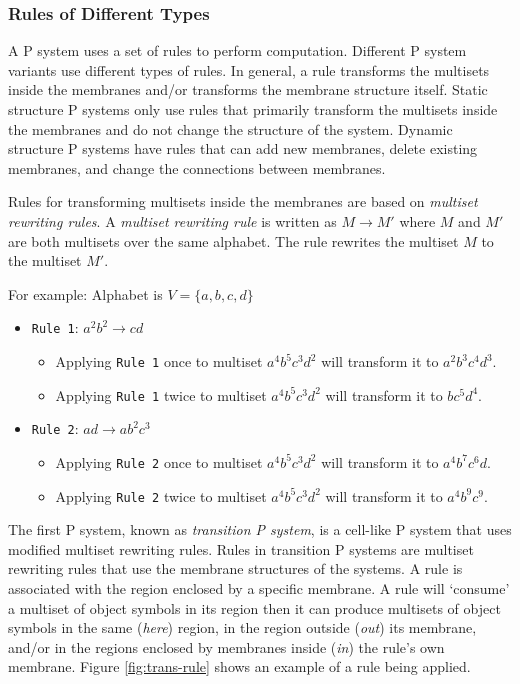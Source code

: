 \documentclass{article}
\begin{document}
\subsubsection{Rules of Different Types}\label{s-rule}

A P system uses a set of rules to perform computation. Different P system variants use different
types of rules. In general, a rule transforms the multisets inside the membranes and/or transforms
the membrane structure itself. Static structure P systems only use rules that primarily
transform the multisets inside the membranes and do not change the structure of the system. Dynamic
structure P systems have rules that can add new membranes, delete existing membranes, and change the
connections between membranes.

Rules for transforming multisets inside the membranes are based on \textit{multiset rewriting 
rules}. A \textit{multiset rewriting rule} is written as $M \rightarrow M'$ where $M$ and $M'$ are 
both multisets over the same alphabet. The rule rewrites the multiset $M$ to the multiset $M'$.

For example: Alphabet is $V = \{a,b,c,d\}$

\begin{itemize}

\item \texttt{Rule 1}: $a^2b^2 \rightarrow cd$
\begin{itemize}
\item Applying \texttt{Rule 1} once to multiset $a^4b^5c^3d^2$ will transform it to $a^2b^3c^4d^3$.
\item Applying \texttt{Rule 1} twice to multiset $a^4b^5c^3d^2$ will transform it to $bc^5d^4$.
\end{itemize}

\item \texttt{Rule 2}: $ad \rightarrow ab^2c^3$
\begin{itemize}
\item Applying \texttt{Rule 2} once to multiset $a^4b^5c^3d^2$ will transform it to $a^4b^7c^6d$.
\item Applying \texttt{Rule 2} twice to multiset $a^4b^5c^3d^2$ will transform it to $a^4b^9c^9$.
\end{itemize}

\end{itemize}

The first P system, known as \textit{transition P system}, is a cell-like P system that uses 
modified multiset rewriting rules. Rules in transition P systems are multiset rewriting rules that
use the membrane structures of the systems. A rule is associated with the region enclosed by a 
specific membrane. A rule will `consume' a multiset of object symbols in its region then it can
produce multisets of object symbols in the same (\textit{here}) region, in the region outside 
(\textit{out}) its membrane, and/or in the regions enclosed by membranes inside (\textit{in}) the
rule's own membrane. Figure \ref{fig:trans-rule} shows an example of a rule being applied.
\end{document}
